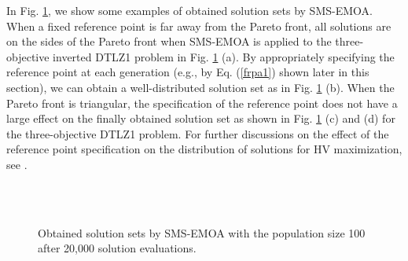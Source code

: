 \documentclass[conference]{IEEEtran}
\begin{document}
In Fig. \ref{rpa2}, we show some examples of obtained solution sets by SMS-EMOA. 
When a fixed reference point is far away from the Pareto front, 
all solutions are on the sides of the Pareto front when SMS-EMOA is 
applied to the three-objective inverted DTLZ1 problem \cite{invertedDTLZ1} in Fig. \ref{rpa2} (a). 
By appropriately specifying the reference point at each generation 
(e.g., by Eq. (\ref{frpa1}) shown later in this section), 
we can obtain a well-distributed solution set as in Fig. \ref{rpa2} (b). 
When the Pareto front is triangular, 
the specification of the reference point does not have a large effect 
on the finally obtained solution set as shown in Fig. \ref{rpa2} (c) and (d) for the three-objective DTLZ1 problem. 
For further discussions on the effect of the reference point specification 
on the distribution of solutions for HV maximization, see \cite{hisao:RPexplanation, hisao:RPspecify, hisao:dynamic}.

\begin{figure}[!t]
  \centering
  \quad
  \\
  \quad
  \\
  \caption{Obtained solution sets by SMS-EMOA with the population size 100 after 20,000 solution evaluations. 
  }
  \label{rpa2}
\end{figure}
\end{document}
